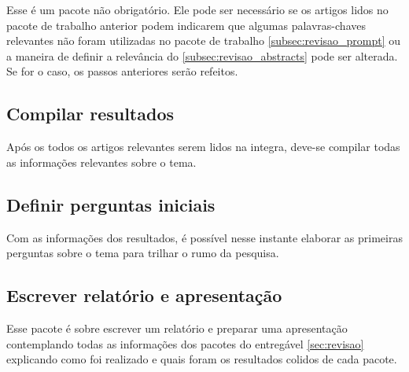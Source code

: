 Esse é um pacote não obrigatório. Ele pode ser necessário se os artigos lidos no pacote de trabalho anterior podem indicarem que algumas palavras-chaves relevantes não foram utilizadas no pacote de trabalho \ref{subsec:revisao_prompt} ou a maneira de definir a relevância do \ref{subsec:revisao_abstracts} pode ser alterada. Se for o caso, os passos anteriores serão refeitos.

\subsection{Compilar resultados}
\label{subsec:revisao_compilar}

Após os todos os artigos relevantes serem lidos na integra, deve-se compilar todas as informações relevantes sobre o tema.

\subsection{Definir perguntas iniciais}
\label{subsec:revisao_perguntas}

Com as informações dos resultados, é possível nesse instante elaborar as primeiras perguntas sobre o tema para trilhar o rumo da pesquisa.

\subsection{Escrever relatório e apresentação}
\label{subsec:revisao_relatorio}

Esse pacote é sobre escrever um relatório e preparar uma apresentação contemplando todas as informações dos pacotes do entregável \ref{sec:revisao} explicando como foi realizado e quais foram os resultados colidos de cada pacote.
